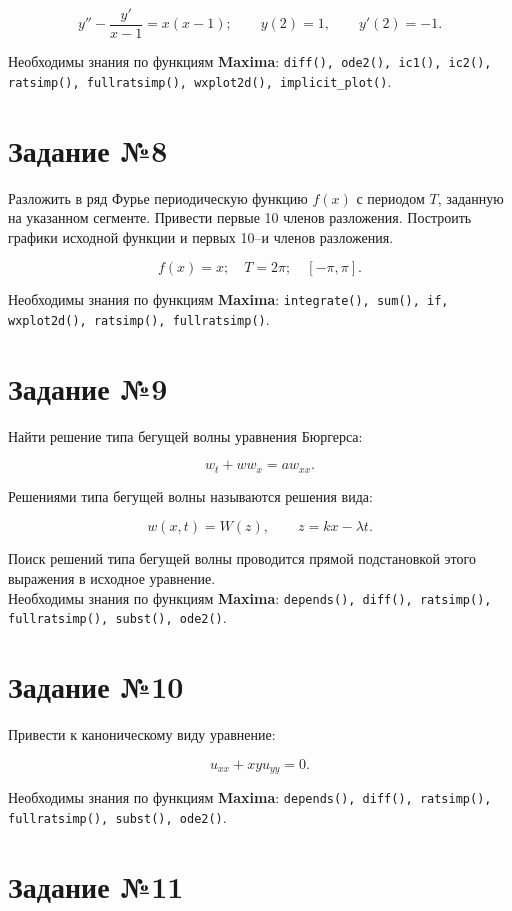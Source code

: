 	\[
		y'' - \frac{y'}{x - 1} = x (x - 1); \qquad y(2) = 1, \qquad y'(2) = -1.
	\]
	
	Необходимы знания по функциям \textbf{Maxima}: {\tt diff(), ode2(), ic1(), ic2(), ratsimp(), fullratsimp(), wxplot2d(), implicit\_plot()}.

\section*{Задание №8}

	Разложить в ряд Фурье периодическую функцию $f(x)$ с периодом $T$, заданную на указанном сегменте. Привести первые 10 членов разложения. Построить графики исходной функции и первых 10--и членов разложения.
	
	\[
		f(x) = x; \quad T = 2 \pi; \quad [-\pi, \pi].
	\]
	
	Необходимы знания по функциям \textbf{Maxima}: {\tt integrate(), sum(), if, wxplot2d(), ratsimp(), fullratsimp()}.

\section*{Задание №9}

    Найти решение типа бегущей волны уравнения Бюргерса:
    
    \[
        w_{t} + w w_{x} = a w_{xx}.
    \]

    Решениями типа бегущей волны называются решения вида:

    \[
        w(x, t) = W(z), \qquad z = k x - \lambda t.
    \]

    Поиск решений типа бегущей волны проводится прямой подстановкой этого выражения в исходное уравнение.\\

    Необходимы знания по функциям \textbf{Maxima}: {\tt depends(), diff(), ratsimp(), fullratsimp(), subst(), ode2()}.

\section*{Задание №10}

	Привести к каноническому виду уравнение:

	\[
		u_{xx} + x y u_{yy} = 0.
	\]

	Необходимы знания по функциям \textbf{Maxima}: {\tt depends(), diff(), ratsimp(), fullratsimp(), subst(), ode2()}.

\section*{Задание №11}

